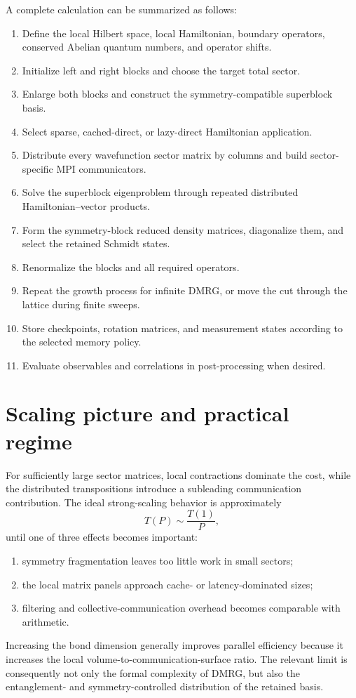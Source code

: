 \documentclass[11pt,a4paper]{article}
\begin{document}
A complete calculation can be summarized as follows:
\begin{enumerate}[label=\arabic*.]
  \item Define the local Hilbert space, local Hamiltonian, boundary operators,
        conserved Abelian quantum numbers, and operator shifts.
  \item Initialize left and right blocks and choose the target total sector.
  \item Enlarge both blocks and construct the symmetry-compatible superblock
        basis.
  \item Select sparse, cached-direct, or lazy-direct Hamiltonian application.
  \item Distribute every wavefunction sector matrix by columns and build
        sector-specific MPI communicators.
  \item Solve the superblock eigenproblem through repeated distributed
        Hamiltonian--vector products.
  \item Form the symmetry-block reduced density matrices, diagonalize them,
        and select the retained Schmidt states.
  \item Renormalize the blocks and all required operators.
  \item Repeat the growth process for infinite DMRG, or move the cut through
        the lattice during finite sweeps.
  \item Store checkpoints, rotation matrices, and measurement states according
        to the selected memory policy.
  \item Evaluate observables and correlations in post-processing when desired.
\end{enumerate}

\section{Scaling picture and practical regime}

For sufficiently large sector matrices, local contractions dominate the
cost, while the distributed transpositions introduce a subleading
communication contribution.  The ideal strong-scaling behavior is
approximately
\begin{equation}
  T(P)\sim\frac{T(1)}{P},
\end{equation}
until one of three effects becomes important:
\begin{enumerate}[label=(\roman*)]
  \item symmetry fragmentation leaves too little work in small sectors;
  \item the local matrix panels approach cache- or latency-dominated sizes;
  \item filtering and collective-communication overhead becomes comparable
        with arithmetic.
\end{enumerate}
Increasing the bond dimension generally improves parallel efficiency because
it increases the local volume-to-communication-surface ratio.  The relevant
limit is consequently not only the formal complexity of DMRG, but also the
entanglement- and symmetry-controlled distribution of the retained basis.
\end{document}
